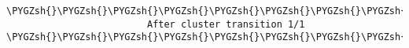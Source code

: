 \documentclass[letterpaper,10pt,english]{sphinxmanual}
\def\PYGZsh{\char`\#}
\begin{document}
\begin{Verbatim}[commandchars=\\\{\}]
\PYGZsh{}\PYGZsh{}\PYGZsh{}\PYGZsh{}\PYGZsh{}\PYGZsh{}\PYGZsh{}\PYGZsh{}\PYGZsh{}\PYGZsh{}\PYGZsh{}\PYGZsh{}\PYGZsh{}\PYGZsh{}\PYGZsh{}\PYGZsh{}\PYGZsh{}\PYGZsh{}\PYGZsh{}\PYGZsh{}\PYGZsh{}\PYGZsh{}\PYGZsh{}\PYGZsh{}\PYGZsh{}\PYGZsh{}\PYGZsh{}\PYGZsh{}\PYGZsh{}\PYGZsh{}\PYGZsh{}\PYGZsh{}\PYGZsh{}\PYGZsh{}\PYGZsh{}\PYGZsh{}\PYGZsh{}\PYGZsh{}\PYGZsh{}\PYGZsh{}\PYGZsh{}\PYGZsh{}\PYGZsh{}\PYGZsh{}\PYGZsh{}\PYGZsh{}\PYGZsh{}\PYGZsh{}\PYGZsh{}\PYGZsh{}\PYGZsh{}\PYGZsh{}\PYGZsh{}\PYGZsh{}\PYGZsh{}\PYGZsh{}\PYGZsh{}\PYGZsh{}\PYGZsh{}\PYGZsh{}\PYGZsh{}\PYGZsh{}\PYGZsh{}\PYGZsh{}\PYGZsh{}\PYGZsh{}\PYGZsh{}\PYGZsh{}\PYGZsh{}\PYGZsh{}\PYGZsh{}\PYGZsh{}\PYGZsh{}\PYGZsh{}\PYGZsh{}\PYGZsh{}\PYGZsh{}\PYGZsh{}\PYGZsh{}
                         After cluster transition 1/1
\PYGZsh{}\PYGZsh{}\PYGZsh{}\PYGZsh{}\PYGZsh{}\PYGZsh{}\PYGZsh{}\PYGZsh{}\PYGZsh{}\PYGZsh{}\PYGZsh{}\PYGZsh{}\PYGZsh{}\PYGZsh{}\PYGZsh{}\PYGZsh{}\PYGZsh{}\PYGZsh{}\PYGZsh{}\PYGZsh{}\PYGZsh{}\PYGZsh{}\PYGZsh{}\PYGZsh{}\PYGZsh{}\PYGZsh{}\PYGZsh{}\PYGZsh{}\PYGZsh{}\PYGZsh{}\PYGZsh{}\PYGZsh{}\PYGZsh{}\PYGZsh{}\PYGZsh{}\PYGZsh{}\PYGZsh{}\PYGZsh{}\PYGZsh{}\PYGZsh{}\PYGZsh{}\PYGZsh{}\PYGZsh{}\PYGZsh{}\PYGZsh{}\PYGZsh{}\PYGZsh{}\PYGZsh{}\PYGZsh{}\PYGZsh{}\PYGZsh{}\PYGZsh{}\PYGZsh{}\PYGZsh{}\PYGZsh{}\PYGZsh{}\PYGZsh{}\PYGZsh{}\PYGZsh{}\PYGZsh{}\PYGZsh{}\PYGZsh{}\PYGZsh{}\PYGZsh{}\PYGZsh{}\PYGZsh{}\PYGZsh{}\PYGZsh{}\PYGZsh{}\PYGZsh{}\PYGZsh{}\PYGZsh{}\PYGZsh{}\PYGZsh{}\PYGZsh{}\PYGZsh{}\PYGZsh{}\PYGZsh{}\PYGZsh{}


\end{Verbatim}
\end{document}
